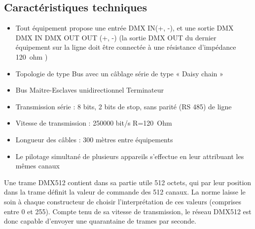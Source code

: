 \subsection{Caractéristiques techniques}
\begin{itemize}
    \item Tout équipement propose une entrée DMX IN(+, -), et une sortie DMX DMX IN
    DMX OUT
    OUT (+, -) (la sortie DMX OUT du dernier équipement sur la ligne doit
    être connectée à une résistance d’impédance \SI{120}{ohm} )
    \item Topologie de type Bus avec un câblage série de type « Daisy chain »
    \item Bus Maitre-Esclaves unidirectionnel
    Terminateur
    \item Transmission série : 8 bits, 2 bits de stop, sans parité (RS 485)
    de ligne
    \item Vitesse de transmission : 250000 bit/s
    R=\SI{120}{Ohm}
    \item Longueur des câbles : 300 mètres entre équipements
    \item Le pilotage simultané de plusieurs appareils s’effectue en leur attribuant
    les mêmes canaux
\end{itemize}

Une trame DMX512 contient dans sa partie utile 512 octets, qui par leur position dans la trame définit la valeur de
commande des 512 canaux. La norme laisse le soin à chaque constructeur de choisir l’interprétation de ces valeurs
(comprises entre 0 et 255). Compte tenu de sa vitesse de transmission, le réseau DMX512 est donc capable
d’envoyer une quarantaine de trames par seconde.

